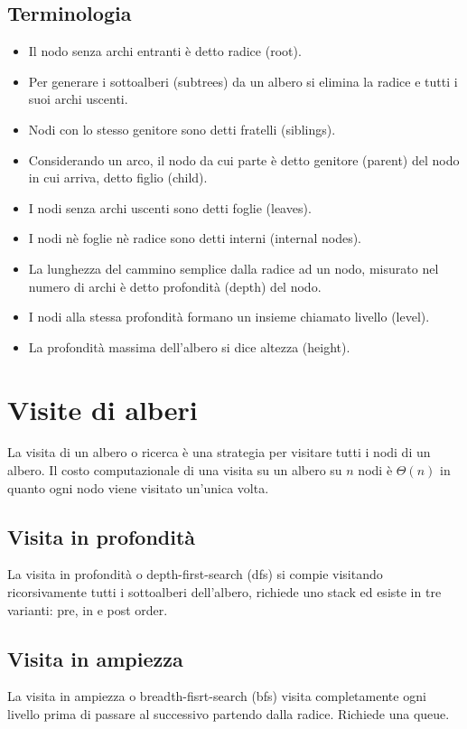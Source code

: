 \subsection{Terminologia}
\begin{itemize}
    \item Il nodo senza archi entranti \`e detto radice (root).
    \item Per generare i sottoalberi (subtrees) da un albero si elimina la radice e tutti i suoi archi uscenti.
    \item Nodi con lo stesso genitore sono detti fratelli (siblings).
    \item Considerando un arco, il nodo da cui parte \`e detto genitore (parent) del nodo in cui arriva, detto figlio (child).
    \item I nodi senza archi uscenti sono detti foglie (leaves).
    \item I nodi n\`e foglie n\`e radice sono detti interni (internal nodes).
    \item La lunghezza del cammino semplice dalla radice ad un nodo, misurato nel numero di archi \`e detto profondit\`a (depth) del nodo.
    \item I nodi alla stessa profondit\`a formano un insieme chiamato livello (level).
    \item La profondit\`a massima dell'albero si dice altezza (height).
\end{itemize}
\section{Visite di alberi}
La visita di un albero o ricerca \`e una strategia per visitare tutti i nodi di un albero. Il costo computazionale di una visita su un albero su $n$ nodi
\`e $\Theta(n)$ in quanto ogni nodo viene visitato un'unica volta.
\subsection{Visita in profondit\`a}
La visita in profondit\`a o depth-first-search (dfs) si compie visitando ricorsivamente tutti i sottoalberi dell'albero, richiede uno stack ed esiste in tre
varianti: pre, in e post order.
\subsection{Visita in ampiezza}
La visita in ampiezza o breadth-fisrt-search (bfs) visita completamente ogni livello prima di passare al successivo partendo dalla radice. Richiede una
queue.
